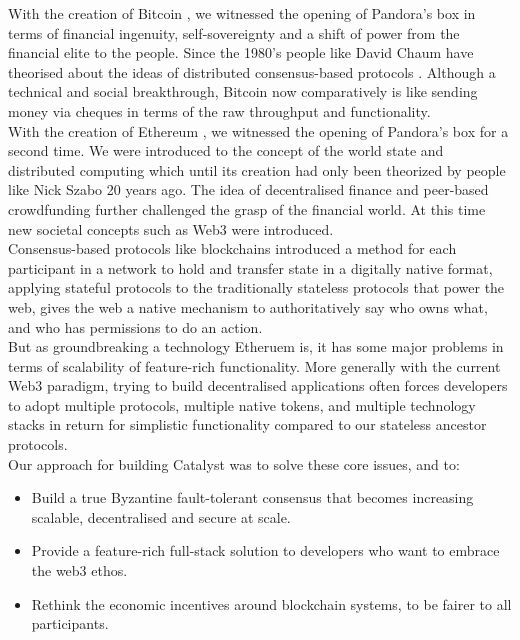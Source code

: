 With the creation of Bitcoin \cite{nakamoto2008bitcoin}, we witnessed the opening of Pandora's box in terms of financial ingenuity, self-sovereignty and a shift of power from the financial elite to the people. Since the 1980's people like David Chaum have theorised about the ideas of distributed consensus-based protocols \cite{chaum1979computer}. Although a technical and social breakthrough, Bitcoin now comparatively is like sending money via cheques in terms of the raw throughput and functionality.
\\
With the creation of Ethereum \cite{wood2014ethereum}, we witnessed the opening of Pandora's box for a second time. We were introduced to the concept of the world state and distributed computing which until its creation had only been theorized by people like Nick Szabo 20 years ago. The idea of decentralised finance and peer-based crowdfunding further challenged the grasp of the financial world. At this time new societal concepts such as Web3 were introduced.
\\
Consensus-based protocols like blockchains introduced a method for each participant in a network to hold and transfer state in a digitally native format, applying stateful protocols to the traditionally stateless protocols that power the web, gives the web a native mechanism to authoritatively say who owns what, and who has permissions to do an action.
\\
But as groundbreaking a technology Etheruem is, it has some major problems in terms of scalability of feature-rich functionality. More generally with the current Web3 paradigm, trying to build decentralised applications often forces developers to adopt multiple protocols, multiple native tokens, and multiple technology stacks in return for simplistic functionality compared to our stateless ancestor protocols.
\\
Our approach for building Catalyst was to solve these core issues, and to:

\begin{itemize}
\item Build a true Byzantine fault-tolerant consensus that becomes increasing scalable, decentralised and secure at scale.
\item Provide a feature-rich full-stack solution to developers who want to embrace the web3 ethos.
\item Rethink the economic incentives around blockchain systems, to be fairer to all participants.
\end{itemize}


\begin{comment}
NB - To be moved to the DFS section?

Catalyst solves this problem through the integration of a Distributed File System (DFS). This enables much more control for peers on the network in terms of what elements of the ledger they hold. This means that lightweight nodes can run with only a subset of the network data. Furthermore, large data files can be securely held on the ledger without causing issues for other nodes due to bloating.


\end{comment}